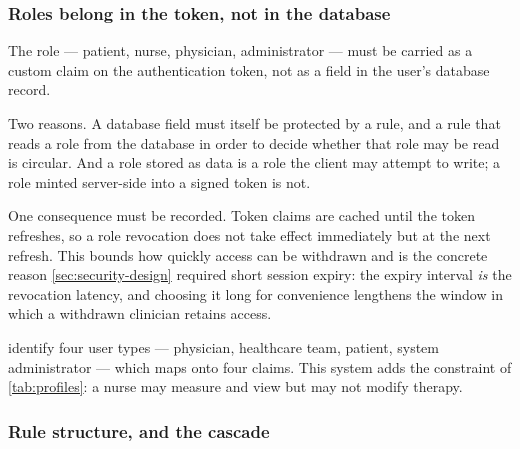 \documentclass[12pt,a4paper,oneside]{report}
\begin{document}
\subsubsection{Roles belong in the token, not in the database}\label{sec:roles}

The role --- patient, nurse, physician, administrator --- must be carried as a custom claim on the authentication token, not as a field in the user's database record.

Two reasons. A database field must itself be protected by a rule, and a rule that reads a role from the database in order to decide whether that role may be read is circular. And a role stored as data is a role the client may attempt to write; a role minted server-side into a signed token is not.

One consequence must be recorded. Token claims are cached until the token refreshes, so a role revocation does not take effect immediately but at the next refresh. This bounds how quickly access can be withdrawn and is the concrete reason \cref{sec:security-design} required short session expiry: the expiry interval \emph{is} the revocation latency, and choosing it long for convenience lengthens the window in which a withdrawn clinician retains access.

\Textcite{yazdani2018} identify four user types --- physician, healthcare team, patient, system administrator --- which maps onto four claims. This system adds the constraint of \cref{tab:profiles}: a nurse may measure and view but may not modify therapy.

\subsubsection{Rule structure, and the cascade}\label{sec:rules}
\end{document}

